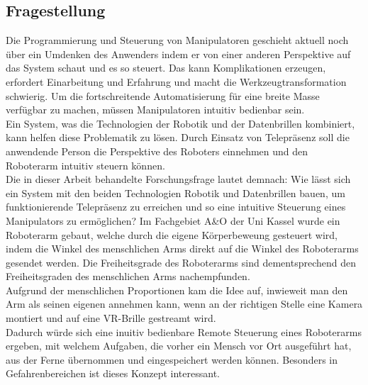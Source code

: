 \subsection{Fragestellung}
  Die Programmierung und Steuerung von Manipulatoren geschieht aktuell noch über ein Umdenken des Anwenders indem er von einer anderen Perspektive auf das System schaut und es so steuert. Das kann Komplikationen erzeugen, erfordert Einarbeitung und Erfahrung und macht die Werkzeugtransformation schwierig. Um die fortschreitende Automatisierung für eine breite Masse verfügbar zu machen, müssen Manipulatoren intuitiv bedienbar sein. \\
  Ein System, was die Technologien der Robotik und der Datenbrillen kombiniert, kann helfen diese Problematik zu lösen. Durch Einsatz von Telepräsenz soll die anwendende Person die Perspektive des Roboters einnehmen und den Roboterarm intuitiv steuern können. \\
  Die in dieser Arbeit behandelte Forschungsfrage lautet demnach:
  Wie lässt sich ein System mit den beiden Technologien Robotik und Datenbrillen bauen, um funktionierende Telepräsenz zu erreichen und so eine intuitive Steuerung eines Manipulators zu ermöglichen?
  Im Fachgebiet A\&O der Uni Kassel wurde ein Roboterarm gebaut, welche durch die eigene Körperbeweung gesteuert wird, indem die Winkel des menschlichen Arms direkt auf die Winkel des Roboterarms gesendet werden. Die Freiheitsgrade des Roboterarms sind dementsprechend den Freiheitsgraden des menschlichen Arms nachempfunden.\\
  Aufgrund der menschlichen Proportionen kam die Idee auf, inwieweit man den Arm als seinen eigenen annehmen kann, wenn an der richtigen Stelle eine Kamera montiert und auf eine VR-Brille gestreamt wird. \\
  Dadurch würde sich eine inuitiv bedienbare Remote Steuerung eines Roboterarms ergeben, mit welchem Aufgaben, die vorher ein Mensch vor Ort ausgeführt hat, aus der Ferne übernommen und eingespeichert werden können. Besonders in Gefahrenbereichen ist dieses Konzept interessant.\\
